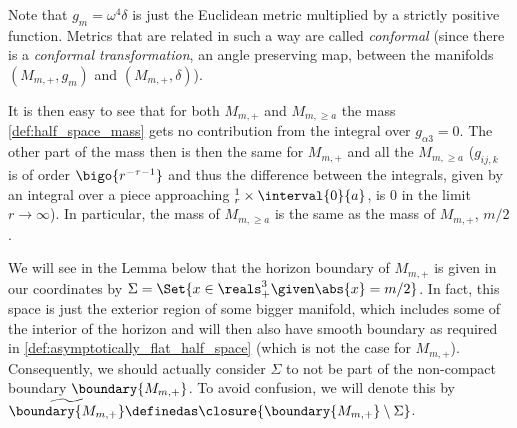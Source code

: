\documentclass[titlepage,numbers=noenddot,headinclude,oneside,%
footinclude=true,cleardoublepage=empty,%
BCOR=5mm,paper=a4,fontsize=11pt,%
english,%
]{scrartcl}
\let\sphere\relax
\newcommand{\sphere}{\mathbb{S}}
\begin{document}
Note that \( g_m=\omega^4 \delta \) is just the Euclidean metric multiplied by a strictly positive function. Metrics that are related in such a way are called \emph{conformal} (since there is a \emph{conformal transformation}, \ie an angle preserving map, between the manifolds \( (M_{m,+},g_m) \) and \( (M_{m,+},\delta) \)).

It is then easy to see that for both \( M_{m,+} \) and \( M_{m,\geq a} \) the mass \cref{def:half_space_mass} gets no contribution from the integral over \( g_{\alpha 3}=0 \). The other part of the mass then is then the same for \( M_{m,+} \) and all the \( M_{m,\geq a} \) (\( g_{ij,k} \) is of order \( \bigo{r^{-\tau-1}} \) and thus the difference between the integrals, given by an integral over a piece approaching \( \sphere^1_r\times \interval{0}{a} \), is \( 0 \) in the limit \( r\to \infty \)). In particular, the mass of \( M_{m,\geq a} \) is the same as the mass of \( M_{m,+} \), \ie \( m/2 \).

We will see in the Lemma below that the horizon boundary of \( M_{m,+} \) is given in our coordinates by \( \Sigma=\Set{x\in \reals^3_+\given \abs{x}=m/2} \). In fact, this space is just the exterior region of some bigger manifold, which includes some of the interior of the horizon and will then also have smooth boundary as required in \cref{def:asymptotically_flat_half_space} (which is not the case for \( M_{m,+} \)). Consequently, we should actually consider \( \Sigma \) to not be part of the non-compact boundary \( \boundary{M_{m,+}} \). 
\newcommand{\schwarzschildboundary}{\widetilde{\boundary{M_{m,+}}}}
\newcommand{\modifiedschwarzschildboundary}{\boundary{M_{m,\geq a}}}
 To avoid confusion, we will denote this by \( \schwarzschildboundary\definedas \closure{\boundary{M_{m,+}}\setminus \Sigma} \).
\end{document}
